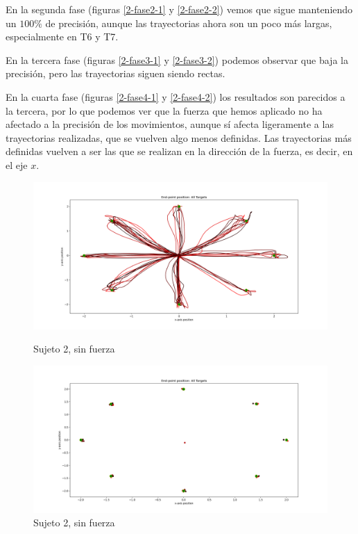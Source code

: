 \documentclass[a4paper,11pt, oneside]{book}
\begin{document}
En la segunda fase (figuras \ref{2-fase2-1} y \ref{2-fase2-2}) vemos que sigue manteniendo un $100\%$ de precisión, aunque las trayectorias ahora son un poco más largas, especialmente en T6 y T7.

En la tercera fase (figuras \ref{2-fase3-1} y \ref{2-fase3-2}) podemos observar que baja la precisión, pero las trayectorias siguen siendo rectas. 

En la cuarta fase (figuras \ref{2-fase4-1} y \ref{2-fase4-2}) los resultados son parecidos a la tercera, por lo que podemos ver que la fuerza que hemos aplicado no ha afectado a la precisión de los movimientos, aunque sí afecta ligeramente a las trayectorias realizadas, que se vuelven algo menos definidas. Las trayectorias más definidas vuelven a ser las que se realizan en la dirección de la fuerza, es decir, en el eje $x$.

\begin{figure}[H]
	\begin{minipage}[b]{0.5\linewidth}
		\centering
		\includegraphics[width=\linewidth]{sujeto2/no_force/trayectorias}
		\caption{Sujeto 2, sin fuerza}
		\label{2-fase1-1}
	\end{minipage}
	\hspace{0.5cm}
	\begin{minipage}[b]{0.5\linewidth}
		\centering
		\includegraphics[width=\linewidth]{sujeto2/no_force/trayectorias_puntos}
		\caption{Sujeto 2, sin fuerza}
		\label{2-fase1-2}
	\end{minipage}
\end{figure}
\end{document}
